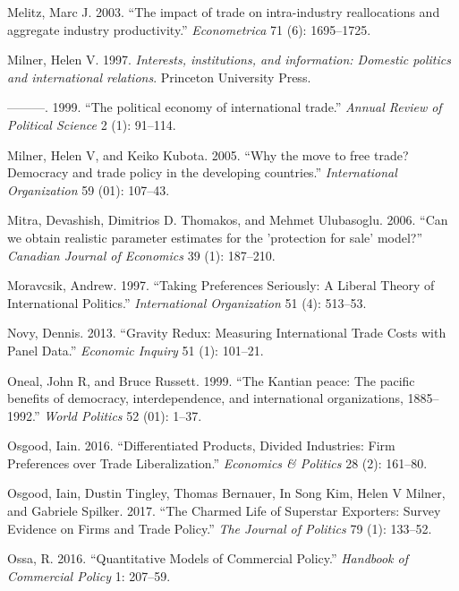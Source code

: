 \documentclass{puthesis}
\newlength{\cslhangindent}
\newenvironment{cslreferences}%
  {\setlength{\parindent}{0pt}%
  \everypar{\setlength{\hangindent}{\cslhangindent}}\ignorespaces}%
  {\par}
\begin{document}
\begin{cslreferences}
\leavevmode\hypertarget{ref-Melitz2003}{}%
Melitz, Marc J. 2003. ``The impact of trade on intra-industry
reallocations and aggregate industry productivity.'' \emph{Econometrica}
71 (6): 1695--1725.

\leavevmode\hypertarget{ref-Milner1997}{}%
Milner, Helen V. 1997. \emph{Interests, institutions, and information:
Domestic politics and international relations}. Princeton University
Press.

\leavevmode\hypertarget{ref-Milner1999}{}%
---------. 1999. ``The political economy of international trade.''
\emph{Annual Review of Political Science} 2 (1): 91--114.

\leavevmode\hypertarget{ref-Milner2005}{}%
Milner, Helen V, and Keiko Kubota. 2005. ``Why the move to free trade?
Democracy and trade policy in the developing countries.''
\emph{International Organization} 59 (01): 107--43.

\leavevmode\hypertarget{ref-Mitra2006}{}%
Mitra, Devashish, Dimitrios D. Thomakos, and Mehmet Ulubasoglu. 2006.
``Can we obtain realistic parameter estimates for the 'protection for
sale' model?'' \emph{Canadian Journal of Economics} 39 (1): 187--210.

\leavevmode\hypertarget{ref-Moravcsik1997}{}%
Moravcsik, Andrew. 1997. ``Taking Preferences Seriously: A Liberal
Theory of International Politics.'' \emph{International Organization} 51
(4): 513--53.

\leavevmode\hypertarget{ref-Novy2013}{}%
Novy, Dennis. 2013. ``Gravity Redux: Measuring International Trade Costs
with Panel Data.'' \emph{Economic Inquiry} 51 (1): 101--21.

\leavevmode\hypertarget{ref-Oneal1999}{}%
Oneal, John R, and Bruce Russett. 1999. ``The Kantian peace: The pacific
benefits of democracy, interdependence, and international organizations,
1885--1992.'' \emph{World Politics} 52 (01): 1--37.

\leavevmode\hypertarget{ref-Osgood2016}{}%
Osgood, Iain. 2016. ``Differentiated Products, Divided Industries: Firm
Preferences over Trade Liberalization.'' \emph{Economics \& Politics} 28
(2): 161--80.

\leavevmode\hypertarget{ref-Osgood2017}{}%
Osgood, Iain, Dustin Tingley, Thomas Bernauer, In Song Kim, Helen V
Milner, and Gabriele Spilker. 2017. ``The Charmed Life of Superstar
Exporters: Survey Evidence on Firms and Trade Policy.'' \emph{The
Journal of Politics} 79 (1): 133--52.

\leavevmode\hypertarget{ref-Ossa2016}{}%
Ossa, R. 2016. ``Quantitative Models of Commercial Policy.''
\emph{Handbook of Commercial Policy} 1: 207--59.


\end{cslreferences}
\end{document}
